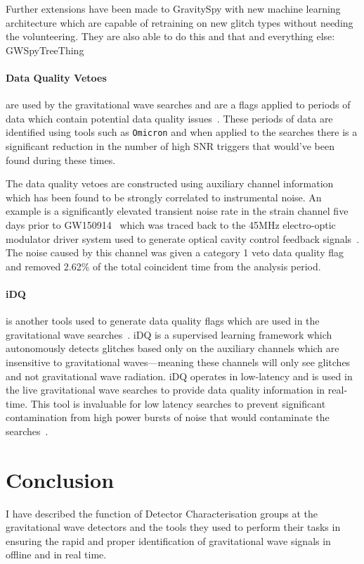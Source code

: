Further extensions have been made to GravitySpy with new machine learning architecture which are capable of retraining on new glitch types without needing the volunteering. They are also able to do this and that and everything else: GWSpyTreeThing~\cite{GSpyNetTree:2023}


\paragraph{Data Quality Vetoes}

are used by the gravitational wave searches and are a flags applied to periods of data which contain potential data quality issues~\cite{DQ_vetoes:2017}. These periods of data are identified using tools such as \verb|Omicron| and when applied to the searches there is a significant reduction in the number of high SNR triggers that would've been found during these times.

The data quality vetoes are constructed using auxiliary channel information which has been found to be strongly correlated to instrumental noise. An example is a significantly elevated transient noise rate in the strain channel five days prior to GW150914~\cite{GW150914:2016} which was traced back to the 45MHz electro-optic modulator driver system used to generate optical cavity control feedback signals~\cite{aLIGO:2015}. The noise caused by this channel was given a category 1 veto data quality flag and removed 2.62\% of the total coincident time from the analysis period.

\paragraph{iDQ}

is another tools used to generate data quality flags which are used in the gravitational wave searches~\cite{iDQ:2020}. iDQ is a supervised learning framework which autonomously detects glitches based only on the auxiliary channels which are insensitive to gravitational waves---meaning these channels will only see glitches and not gravitational wave radiation. iDQ operates in low-latency and is used in the live gravitational wave searches to provide data quality information in real-time. This tool is invaluable for low latency searches to prevent significant contamination from high power bursts of noise that would contaminate the searches~\cite{LIGO_data_quality:2015}.

\section{Conclusion}

I have described the function of Detector Characterisation groups at the gravitational wave detectors and the tools they used to perform their tasks in ensuring the rapid and proper identification of gravitational wave signals in offline and in real time. 
